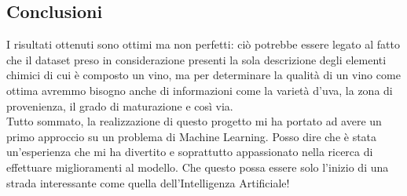 \documentclass{article}
\begin{document}
\begin{titlepage}
        \section{Conclusioni}
        I risultati ottenuti sono ottimi ma non perfetti: ciò potrebbe essere legato al fatto che il dataset preso in considerazione presenti la sola descrizione degli elementi chimici di cui è composto un vino, ma per determinare la qualità di un vino come ottima avremmo bisogno anche di informazioni come la varietà d'uva, la zona di provenienza, il grado di maturazione e così via.\\
        Tutto sommato, la realizzazione di questo progetto mi ha portato ad avere un primo approccio su un problema di Machine Learning. Posso dire che è stata un'esperienza che mi ha divertito e soprattutto appassionato nella ricerca di effettuare miglioramenti al modello. Che questo possa essere solo l'inizio di una strada interessante come quella dell'Intelligenza Artificiale!
        
\end{titlepage}
\end{document}
